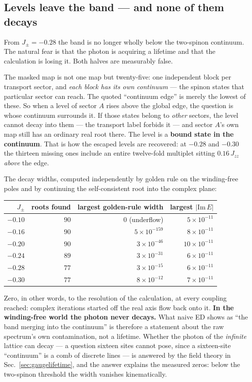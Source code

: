 \documentclass[11pt,a4paper]{article}
\newcommand{\Jpm}{J_{\pm}}
\newcommand{\Jzz}{J_{zz}}
\begin{document}
\subsection{Levels leave the band --- and none of them decays}
\label{sec:bic}

From $\Jpm=-0.28$ the band is no longer wholly below the two-spinon
continuum.  The natural fear is that the photon is acquiring a lifetime and
that the calculation is losing it.  Both halves are measurably false.

The masked map is not one map but twenty-five: one independent block per
transport sector, and \emph{each block has its own continuum} --- the spinon
states that particular sector can reach.  The quoted ``continuum edge'' is
merely the lowest of these.  So when a level of sector $A$ rises above the
global edge, the question is whose continuum surrounds it.  If those states
belong to \emph{other} sectors, the level cannot decay into them --- the
transport label forbids it --- and sector $A$'s own map still has an
ordinary real root there.  The level is a \textbf{bound state in the
continuum}.  That is how the escaped levels are recovered: at $-0.28$ and
$-0.30$ the thirteen missing ones include an entire twelve-fold multiplet
sitting $0.16\,\Jzz$ \emph{above} the edge.

The decay widths, computed independently by golden rule on the winding-free
poles and by continuing the self-consistent root into the complex plane:

\begin{center}
\small
\begin{tabular}{rrrr}
\toprule
$\Jpm$ & roots found & largest golden-rule width & largest $|\mathrm{Im}\,E|$\\
\midrule
$-0.10$ & $90$ & $0$ (underflow) & $5\times10^{-11}$\\
$-0.16$ & $90$ & $5\times10^{-159}$ & $8\times10^{-11}$\\
$-0.20$ & $90$ & $3\times10^{-46}$ & $10\times10^{-11}$\\
$-0.24$ & $89$ & $3\times10^{-31}$ & $6\times10^{-11}$\\
$-0.28$ & $77$ & $3\times10^{-15}$ & $6\times10^{-11}$\\
$-0.30$ & $77$ & $8\times10^{-12}$ & $7\times10^{-11}$\\
\bottomrule
\end{tabular}
\end{center}

Zero, in other words, to the resolution of the calculation, at every
coupling reached: complex iterations started off the real axis flow back
onto it.  \textbf{In the winding-free world the photon never decays.}  What
naive ED shows as ``the band merging into the continuum'' is therefore a
statement about the raw spectrum's own contamination, not a lifetime.
Whether the photon of the \emph{infinite} lattice can decay --- a question
sixteen sites cannot pose, since a sixteen-site ``continuum'' is a comb of
discrete lines --- is answered by the field theory in
Sec.~\ref{sec:gaugelifetime}, and the answer explains the measured zeros:
below the two-spinon threshold the width vanishes kinematically.
\end{document}
